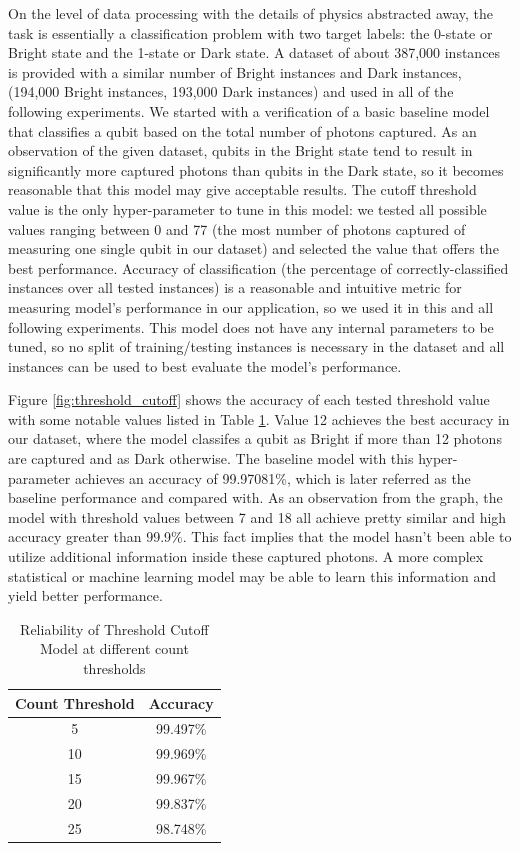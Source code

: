 \documentclass[letterpaper,twocolumn,10pt]{article}
\begin{document}
On the level of data processing with the details of physics abstracted away, the task is essentially a classification problem with two target labels: the 0-state or Bright state and the 1-state or Dark state. A dataset of about 387,000 instances is provided with a similar number of Bright instances and Dark instances, (194,000 Bright instances, 193,000 Dark instances) and used in all of the following experiments. We started with a verification of a basic baseline model that classifies a qubit based on the total number of photons captured. As an observation of the given dataset, qubits in the Bright state tend to result in significantly more captured photons than qubits in the Dark state, so it becomes reasonable that this model may give acceptable results. The cutoff threshold value is the only hyper-parameter to tune in this model: we tested all possible values ranging between 0 and 77 (the most number of photons captured of measuring one single qubit in our dataset) and selected the value that offers the best performance. Accuracy of classification (the percentage of correctly-classified instances over all tested instances) is a reasonable and intuitive metric for measuring model's performance in our application, so we used it in this and all following experiments. This model does not have any internal parameters to be tuned, so no split of training/testing instances is necessary in the dataset and all instances can be used to best evaluate the model's performance.

Figure \ref{fig:threshold_cutoff} shows the accuracy of each tested threshold value with some notable values listed in Table \ref{table:threshold_cutoff}. Value 12 achieves the best accuracy in our dataset, where the model classifes a qubit as Bright if more than 12 photons are captured and as Dark otherwise. The baseline model with this hyper-parameter achieves an accuracy of 99.97081\%, which is later referred as the baseline performance and compared with. As an observation from the graph, the model with threshold values between 7 and 18 all achieve pretty similar and high accuracy greater than 99.9\%. This fact implies that the model hasn't been able to utilize additional information inside these captured photons. A more complex statistical or machine learning model may be able to learn this information and yield better performance. 

\begin{table}
    \caption{Reliability of Threshold Cutoff Model at different count thresholds}
    \begin{center}
        \begin{tabular}{c c}
            Count Threshold & Accuracy \\ [0.5ex] 
            \hline
            5 & 99.497\% \\ 
            10 & 99.969\% \\
            15 & 99.967\% \\
            20 & 99.837\% \\
            25 & 98.748\% \\
       \end{tabular}
    \end{center}
    \label{table:threshold_cutoff}  
\end{table}
\end{document}
